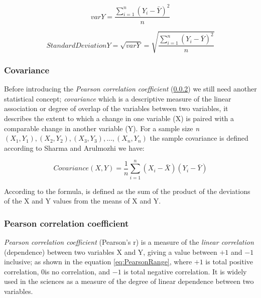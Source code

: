 \begin{equation} \label{eq:VarY}
	var Y = \frac{\sum ^n _{i=1}{(Y_i - \bar{Y})}^2}{n}
\end{equation}

\begin{equation} \label{eq:sdY}
	Standard Deviation Y = \sqrt{var Y} = \sqrt{\frac{\sum ^n _{i=1}{(Y_i - \bar{Y})}^2}{n}}
\end{equation}


 \subsubsection{Covariance}\label{covariance}

Before introducing the \emph{Pearson correlation coefficient} (\ref{PearsonCorr}) we still need another statistical concept; \emph{covariance} which is a descriptive measure of the linear association or degree of overlap of the variables between two variables, it describes the extent to which a change in one variable (X) is paired with a comparable change in another variable (Y). For a sample size \emph{n} \begin{math}(X_{1},Y_{1}), (X_{2},Y_{2}), (X_{3},Y_{3}), ... , (X_{n},Y_{n}) \end{math} the sample covariance is defined according to Sharma \cite{PP2014} and Arulmozhi \cite{ARU2009} we have:

\begin{equation} \label{eq:PearsonCovariance1}
	Covariance (X, Y) = \frac{1}{n} \sum ^n _{i=1}(X_i - \bar{X})(Y_i - \bar{Y})
\end{equation}

According to the formula, is defined as the sum of the product of the deviations of the X and Y values from the means of X and Y.

 \subsubsection{Pearson correlation coefficient}\label{PearsonCorr}
 \emph{Pearson correlation coefficient} (Pearson's r) is a measure of the \emph{linear correlation} (dependence) between two variables X and Y, giving a value between \begin{math}+1\end{math} and \begin{math}-1\end{math} inclusive; as shown in the equation \ref{eq:PearsonRange}, where \begin{math}+1\end{math} is total positive correlation, \begin{math}0\end{math}is no correlation, and \begin{math}-1\end{math} is total negative correlation. It is widely used in the sciences as a measure of the degree of linear dependence between two variables.

